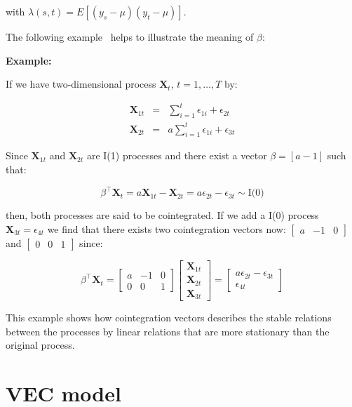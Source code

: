 \noindent with $\lambda(s,t) = E[(y_s-\mu)(y_t - \mu)]$.

The following example~\cite{johansen1995} helps to illustrate the meaning
of $\beta$:

\textbf{Example:}

If we have two-dimensional process $\mathbf{X}_t$, $t=1,\dots,T$ by:

\begin{eqnarray*}
\mathbf{X}_{1t} &=& \sum_{i=1}^t \epsilon_{1i} + \epsilon_{2t} \\
\mathbf{X}_{2t} &=& a \sum_{i=1}^t \epsilon_{1i} + \epsilon_{3t} 
\end{eqnarray*}

Since $\mathbf{X}_{1t}$ and $\mathbf{X}_{2t}$ are I(1) processes and there
exist a vector $\beta = [a -1]$ such that:

\[
\beta^\top \mathbf{X}_t = a \mathbf{X}_{1t} -\mathbf{X}_{2t} = 
a\epsilon_{2t} - \epsilon_{3t} \sim \text{I(0)}
\]

then, both processes are said to be cointegrated. If we add a I(0) process
$\mathbf{X}_{3t} = \epsilon_{4t}$  we find that there exists two cointegration
vectors now: $\begin{bmatrix}a &-1& 0\end{bmatrix}$ and $\begin{bmatrix}0
&0&1\end{bmatrix}$ since:

\[
\beta^\top \mathbf{X}_t = 
\begin{bmatrix}
a & -1 & 0 \\
0 & 0 & 1
\end{bmatrix} 
\begin{bmatrix} 
\mathbf{X}_{1t} \\
\mathbf{X}_{2t} \\
\mathbf{X}_{3t}
\end{bmatrix} = 
\begin{bmatrix}
a\epsilon_{2t} - \epsilon_{3t} \\
\epsilon_{4t}
\end{bmatrix}
\]

This example shows how cointegration vectors describes the stable relations
between the processes by linear relations that are more stationary than the
original process.

\section{VEC model}

